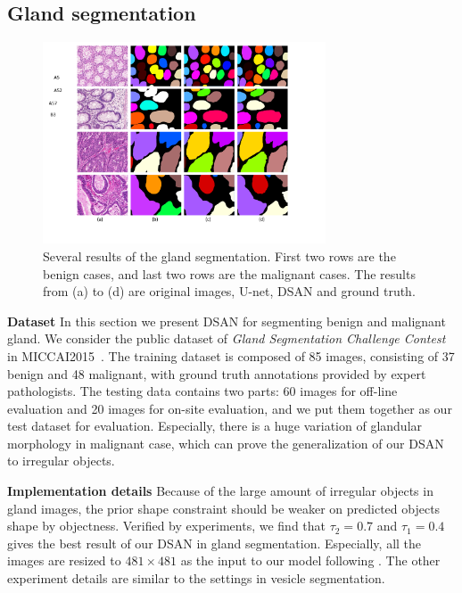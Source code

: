 \subsection{Gland segmentation}
\begin{figure}
    \begin{center}
        \includegraphics[width=3.3in]{figures/FigGland.pdf}
    \end{center}
    \caption{Several results of the gland segmentation.
    First two rows are the benign cases, and last two rows are the malignant cases.
    The results from (a) to (d) are original images, U-net, DSAN and ground truth.}
    \label{FigGland}
\end{figure}
\textbf{Dataset}
In this section we present DSAN for segmenting benign and malignant gland.
We consider the public dataset of \emph{Gland Segmentation Challenge Contest} in MICCAI2015~\cite{Sirinukunwattana2015a}.
The training dataset is composed of 85 images, consisting of 37 benign and 48 malignant, with ground truth annotations provided by expert pathologists.
The testing data contains two parts: 60 images for off-line evaluation and 20 images for on-site evaluation, and we put them together as our test dataset for evaluation.
Especially, there is a huge variation of glandular morphology in malignant case, which can prove the generalization of our DSAN to irregular objects.

\noindent\textbf{Implementation details}
Because of the large amount of irregular objects in gland images, the prior shape constraint should be weaker on predicted objects shape by objectness.
Verified by experiments, we find that $\tau_2=0.7$ and $\tau_1=0.4 $ gives the best result of our DSAN in gland segmentation.
Especially, all the images are resized to $481\times 481$ as the input to our model following \cite{Chen2014a}.
The other experiment details are similar to the settings in vesicle segmentation.

